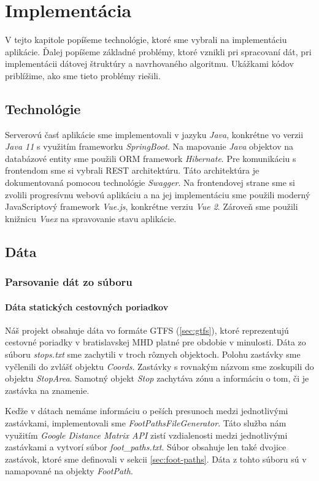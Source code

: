 \chapter{Implementácia}
\label{kap:imp}
V tejto kapitole popíšeme technológie, ktoré sme vybrali na implementáciu aplikácie. Ďalej popíšeme základné problémy, ktoré vznikli pri spracovaní dát, pri implementácii dátovej štruktúry a navrhovaného algoritmu. Ukážkami kódov priblížime, ako sme tieto problémy riešili. 

\section{Technológie}
Serverovú časť aplikácie sme implementovali v jazyku \textit{Java}, konkrétne vo verzii \textit{Java 11} s využitím frameworku \textit{SpringBoot}. Na mapovanie \textit{Java} objektov na databázové entity sme použili ORM framework \textit{Hibernate}. Pre komunikáciu s frontendom sme si vybrali REST architektúru. Táto architektúra je dokumentovaná pomocou technológie \textit{Swagger}. Na frontendovej strane sme si zvolili progresívnu webovú aplikáciu a na jej implementáciu sme použili moderný JavaScriptový framework \textit{Vue.js}, konkrétne verziu \textit{Vue 2}. Zároveň sme použili knižnicu \textit{Vuex} na spravovanie stavu aplikácie. 

\section{Dáta}
\subsection{Parsovanie dát zo súboru}
\label{sec:parsing}
\subsubsection{Dáta statických cestovných poriadkov}
Náš projekt obsahuje dáta vo formáte GTFS (\ref{sec:gtfs}), ktoré reprezentujú cestovné poriadky v bratislavskej MHD platné pre obdobie v minulosti. 
Dáta zo súboru \textit{stops.txt} sme zachytili v troch rôznych objektoch. Polohu zastávky sme vyčlenili do zvlášť objektu \textit{Coords}. Zastávky s rovnakým názvom sme zoskupili do objektu \textit{StopArea}. Samotný objekt \textit{Stop} zachytáva zónu a informáciu o tom, či je zastávka na znamenie. 

Keďže v dátach nemáme informáciu o peších presunoch medzi jednotlivými zastávkami, implementovali sme \textit{FootPathsFileGenerator}. Táto služba nám využitím \textit{Google Distance Matrix API} zistí vzdialenosti medzi jednotlivými zastávkami a vytvorí súbor \textit{foot\_paths.txt}. Súbor obsahuje len také dvojice zastávok, ktoré sme definovali v sekcii \ref{sec:foot-paths}. Dáta z tohto súboru sú v namapované na objekty \textit{FootPath}. 

